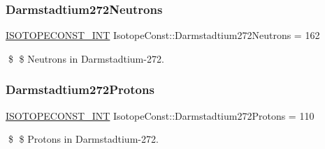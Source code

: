 \subsubsection{\texorpdfstring{Darmstadtium272\+Neutrons}{Darmstadtium272Neutrons}}
{\footnotesize\ttfamily \mbox{\hyperlink{group___isotope_const-_macros_ga5f18360b3e99483a35c32d789e62621c}{I\+S\+O\+T\+O\+P\+E\+C\+O\+N\+S\+T\+\_\+\+I\+NT}} Isotope\+Const\+::\+Darmstadtium272\+Neutrons = 162}

\$ \$ Neutrons in Darmstadtium-\/272. \mbox{\label{group___isotope_const-_darmstadtium-_ds272_ga77072983a8741e42e7ada1727c047e9d}} 
\subsubsection{\texorpdfstring{Darmstadtium272\+Protons}{Darmstadtium272Protons}}
{\footnotesize\ttfamily \mbox{\hyperlink{group___isotope_const-_macros_ga5f18360b3e99483a35c32d789e62621c}{I\+S\+O\+T\+O\+P\+E\+C\+O\+N\+S\+T\+\_\+\+I\+NT}} Isotope\+Const\+::\+Darmstadtium272\+Protons = 110}

\$ \$ Protons in Darmstadtium-\/272. 